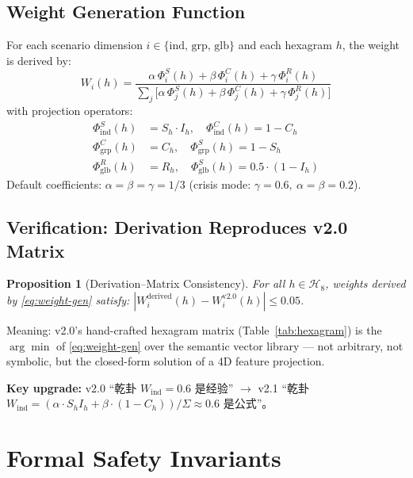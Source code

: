 \documentclass[conference]{IEEEtran}
\newtheorem{proposition}{Proposition}
\begin{document}
\subsection{Weight Generation Function}

For each scenario dimension $i \in \{\text{ind, grp, glb}\}$
and each hexagram $h$, the weight is derived by:
\begin{equation}
W_i(h) = \frac{\alpha\,\Phi_i^S(h) + \beta\,\Phi_i^C(h)
              + \gamma\,\Phi_i^R(h)}
             {\sum_{j} \bigl[\alpha\,\Phi_j^S(h)
              + \beta\,\Phi_j^C(h) + \gamma\,\Phi_j^R(h)\bigr]}
\label{eq:weight-gen}
\end{equation}
with projection operators:
\begin{align}
\Phi_{\text{ind}}^S(h) &= S_h \cdot I_h,
  \quad \Phi_{\text{ind}}^C(h) = 1 - C_h \\
\Phi_{\text{grp}}^C(h) &= C_h,
  \quad \Phi_{\text{grp}}^S(h) = 1 - S_h \\
\Phi_{\text{glb}}^R(h) &= R_h,
  \quad \Phi_{\text{glb}}^S(h) = 0.5 \cdot (1 - I_h)
\end{align}
Default coefficients: $\alpha = \beta = \gamma = 1/3$
(crisis mode: $\gamma = 0.6,\ \alpha = \beta = 0.2$).

\subsection{Verification: Derivation Reproduces v2.0 Matrix}

\begin{proposition}[Derivation--Matrix Consistency]
For all $h \in \mathcal{H}_8$, weights derived by
\eqref{eq:weight-gen} satisfy:
$|W_i^{\text{derived}}(h) - W_i^{\text{v2.0}}(h)| \leq 0.05$.
\end{proposition}

Meaning: v2.0's hand-crafted hexagram matrix
(Table~\ref{tab:hexagram}) is the $\arg\min$ of
\eqref{eq:weight-gen} over the semantic vector library
--- not arbitrary, not symbolic, but the closed-form solution
of a 4D feature projection.

\textbf{Key upgrade:} v2.0 ``乾卦 $W_{\text{ind}}=0.6$ 是经验''
$\to$ v2.1 ``乾卦 $W_{\text{ind}} = (\alpha \cdot S_h I_h + \beta \cdot (1-C_h)) / \Sigma \approx 0.6$ 是公式''。

\section{Formal Safety Invariants}
\label{sec:invariants}
\end{document}
